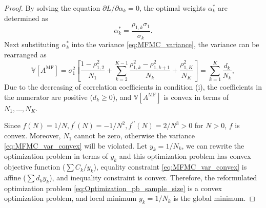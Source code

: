 \begin{proof}

By solving the equation $\partial L/\partial \alpha_k=0$, the optimal weights $\alpha_k^*$ are determined as
%
\[
\alpha_k^*=\frac{\rho_{1,k}\sigma_1}{\sigma_k}.
\]
%
Next substituting $\alpha_k^*$ into the variance \eqref{eq:MFMC_variance}, the variance can be rearranged as
%
\begin{equation}\label{eq:MFMC_var_convex}
    \mathbb{V}\left[A^{\text{MF}}\right]=\sigma_1^2\left[\frac{1-\rho_{1,2}^2}{N_1} + \sum_{k=2}^{K-1} \frac{\rho_{1,k}^2-\rho_{1,k+1}^2}{N_k} + \frac{\rho_{1,K}^2}{N_K} \right] = \sum_{k=1}^K\frac{d_k}{N_k},
\end{equation}
%
Due to the decreasing of correlation coefficients in condition (i), the coefficients in the numerator are positive ($d_k\ge 0$), and $\mathbb{V}\left[A^{\text{MF}}\right]$ is convex in terms of $N_1,\ldots, N_K$. 

Since $f(N)=1/N, f^\prime (N)=-1/N^2, f^{\prime\prime}(N)=2/N^3>0$ for $N>0$, $f$ is convex. Moreover, $N_1$ cannot be zero, otherwise the variance \eqref{eq:MFMC_var_convex} will be violated. Let $y_k = 1/N_k$, we can rewrite the optimization problem in terms of $y_k$ and this optimization problem has convex objective function ($\sum C_k/y_k$), equality constraint \eqref{eq:MFMC_var_convex} is affine ($\sum d_k y_k$), and inequality constraint is convex. Therefore, the reformulated optimization problem \eqref{eq:Optimization_pb_sample_size} is a convex optimization problem, and local minimum $y_k = 1/N_k$ is the global minimum.



\end{proof}
